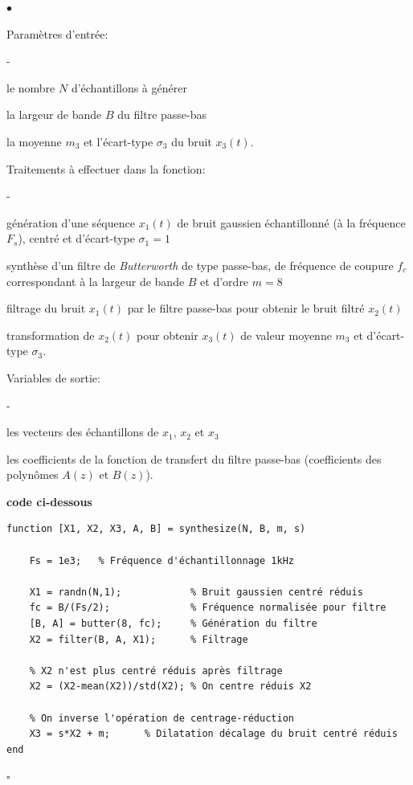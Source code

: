 \documentclass{article}
\newcommand{\debutrep}[1]{\color{blue}\begin{center} \hrulefill \textbf{ #1 } \hrulefill \end{center} }
\newcommand{\finrep}{\vspace*{5mm}\hfill $\square$\color{black}\vspace*{5mm}}
\begin{document}
\begin{list}{$\bullet$}{\setlength{\leftmargin}{3mm} \setlength{\labelwidth}{20mm} \setlength{\labelsep}{2mm} \setlength{\itemsep}{1mm} }
\item Paramètres d'entrée:
\begin{list}{-}{\setlength{\leftmargin}{3mm} \setlength{\labelwidth}{20mm} \setlength{\labelsep}{2mm} \setlength{\itemsep}{1mm} }
\item le nombre $N$ d'échantillons à générer
\item la largeur de bande $B$ du filtre passe-bas
\item la moyenne $m_3$ et l'écart-type $\sigma_3$ du bruit $x_3(t)$.
\end{list}
\item Traitements à effectuer dans la fonction:
\begin{list}{-}{\setlength{\leftmargin}{3mm} \setlength{\labelwidth}{20mm} \setlength{\labelsep}{2mm} \setlength{\itemsep}{1mm} }
\item génération d'une séquence $x_1(t)$ de bruit gaussien échantillonné (à la fréquence $F_s$), centré et d'écart-type $\sigma_1=1$
\item synthèse d'un filtre de {\em Butterworth} de type passe-bas, de fréquence de coupure $f_c$ correspondant à la largeur de bande $B$ et d'ordre $m=8$
\item filtrage du bruit $x_1(t)$ par le filtre passe-bas pour obtenir le bruit filtré $x_2(t)$
\item transformation de $x_2(t)$ pour obtenir $x_3(t)$ de  valeur moyenne $m_3$ et d'écart-type $\sigma_3$.
\end{list}
\item Variables de sortie:
\begin{list}{-}{\setlength{\leftmargin}{3mm} \setlength{\labelwidth}{20mm} \setlength{\labelsep}{2mm} \setlength{\itemsep}{1mm} }
\item les vecteurs des échantillons de $x_1$, $x_2$ et $x_3$
\item les coefficients de la fonction de transfert du filtre passe-bas (coefficients des polynômes $A(z)$ et $B(z)$).
\end{list}
\end{list}


\debutrep{code ci-dessous}
 \begin{verbatim}
function [X1, X2, X3, A, B] = synthesize(N, B, m, s)
    
    Fs = 1e3;   % Fréquence d'échantillonnage 1kHz

    X1 = randn(N,1);            % Bruit gaussien centré réduis
    fc = B/(Fs/2);              % Fréquence normalisée pour filtre
    [B, A] = butter(8, fc);     % Génération du filtre
    X2 = filter(B, A, X1);      % Filtrage

    % X2 n'est plus centré réduis après filtrage
    X2 = (X2-mean(X2))/std(X2); % On centre réduis X2
    
    % On inverse l'opération de centrage-réduction
    X3 = s*X2 + m;      % Dilatation décalage du bruit centré réduis
end
 \end{verbatim}
\finrep
 
\end{document}
